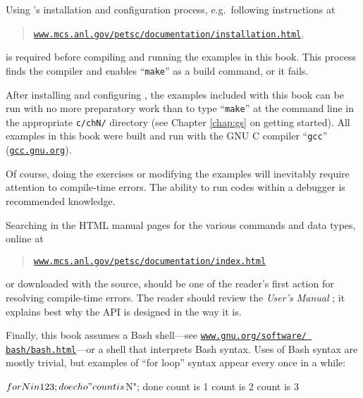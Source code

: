 Using \PETSc's installation and configuration process, e.g.~following instructions at
\begin{quote}
\href{http://www.mcs.anl.gov/petsc/documentation/installation.html}{\texttt{www.mcs.anl.gov/petsc/documentation/installation.html}},
\end{quote}
is required before compiling and running the examples in this book.  This process finds the compiler and enables ``\texttt{make}'' as a build command, or it fails.

After installing and configuring \PETSc, the examples included with this book can be run with no more preparatory work than to type ``\texttt{make}'' at the command line in the appropriate \texttt{c/chN/} directory (see Chapter \ref{chap:gs} on getting started).  All examples in this book were built and run with the GNU C compiler ``\texttt{gcc}'' (\href{https://gcc.gnu.org/}{\texttt{gcc.gnu.org}}).

Of course, doing the exercises or modifying the examples will inevitably require attention to compile-time errors.  The ability to run codes within a debugger is recommended knowledge.

Searching in the \PETSc HTML manual pages for the various commands and data types, online at
\begin{quote}
\href{http://www.mcs.anl.gov/petsc/documentation/index.html}{\texttt{www.mcs.anl.gov/petsc/documentation/index.html}}
\end{quote}
or downloaded with the \PETSc source, should be one of the reader's first action for resolving compile-time errors.  The reader should review the \emph{\PETSc User's Manual} \citep{petsc-user-ref}; it explains best why the API is designed in the way it is.

Finally, this book assumes a Bash shell---see  \href{https://www.gnu.org/software/bash/bash.html}{\texttt{www.gnu.org/software/ bash/bash.html}}---or a shell that interprets Bash syntax.  Uses of Bash syntax are mostly trivial, but examples of ``for loop'' syntax appear every once in a while:
\begin{cline}
$ for N in 1 2 3; do echo "count is $N"; done
count is 1
count is 2
count is 3
\end{cline}
